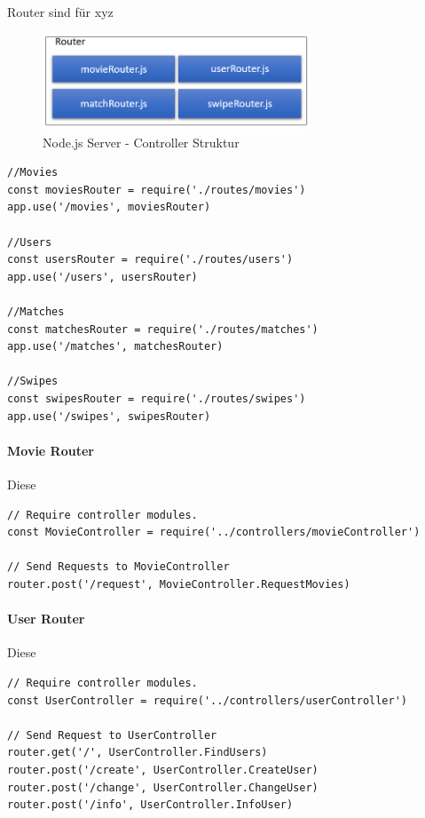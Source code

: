 Router sind für xyz

\begin{figure}[h]
\centering
\includegraphics[width=8cm]{images/routestruktur.PNG}
\caption{Node.js Server - Controller Struktur}
\end{figure}


\begin{lstlisting}[caption=TODO, label=lst:TODO]
//Movies
const moviesRouter = require('./routes/movies')
app.use('/movies', moviesRouter)

//Users
const usersRouter = require('./routes/users')
app.use('/users', usersRouter)

//Matches
const matchesRouter = require('./routes/matches')
app.use('/matches', matchesRouter)

//Swipes
const swipesRouter = require('./routes/swipes')
app.use('/swipes', swipesRouter)

\end{lstlisting}


\paragraph{Movie Router}
Diese
\begin{lstlisting}[caption=TODO, label=lst:TODO]
// Require controller modules.
const MovieController = require('../controllers/movieController')

// Send Requests to MovieController
router.post('/request', MovieController.RequestMovies)
\end{lstlisting}

\paragraph{User Router}
Diese
\begin{lstlisting}[caption=TODO, label=lst:TODO]
// Require controller modules.
const UserController = require('../controllers/userController')

// Send Request to UserController
router.get('/', UserController.FindUsers)
router.post('/create', UserController.CreateUser)
router.post('/change', UserController.ChangeUser)
router.post('/info', UserController.InfoUser)
\end{lstlisting}

